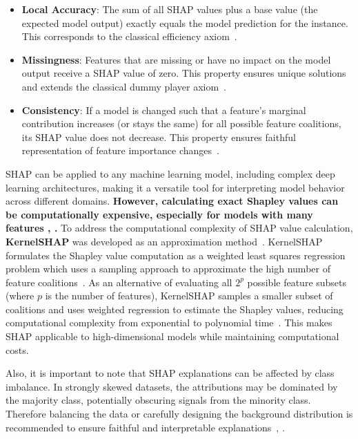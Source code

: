 \begin{itemize}
    \item \textbf{Local Accuracy}: The sum of all SHAP values plus a base value (the expected model output) exactly equals the model prediction for the instance. This corresponds to the classical efficiency axiom~\cite{lundberg2017shap}.
    \item \textbf{Missingness}: Features that are missing or have no impact on the model output receive a SHAP value of zero. This property ensures unique solutions and extends the classical dummy player axiom~\cite{lundberg2017shap}.
    \item \textbf{Consistency}: If a model is changed such that a feature's marginal contribution increases (or stays the same) for all possible feature coalitions, its SHAP value does not decrease. This property ensures faithful representation of feature importance changes~\cite{lundberg2017shap}.
\end{itemize}

SHAP can be applied to any machine learning model, including complex deep learning architectures, making it a versatile tool for interpreting model behavior across different domains. \textbf{However, calculating exact Shapley values can be computationally expensive, especially for models with many features \cite{rozemberczki2022shapley}, \cite{aas2021explaining}.}  To address the computational complexity of SHAP value calculation, \textbf{KernelSHAP} was developed as an approximation method~\cite{lundberg2017shap}. KernelSHAP formulates the Shapley value computation as a weighted least squares regression problem which uses a sampling approach to approximate the high number of feature coalitions~\cite{covert2021}. As an alternative of evaluating all $2^p$ possible feature subsets (where $p$ is the number of features), KernelSHAP samples a smaller subset of coalitions and uses weighted regression to estimate the Shapley values, reducing computational complexity from exponential to polynomial time~\cite{rozemberczki2022shapley}. This makes SHAP applicable to high-dimensional models while maintaining computational costs.

Also, it is important to note that SHAP explanations can be affected by class imbalance. In strongly skewed datasets, the attributions may be dominated by the majority class, potentially obscuring signals from the minority class. Therefore balancing the data or carefully designing the background distribution is recommended to ensure faithful and interpretable explanations~\cite{liu2022balancedbackgroundexplanationdata}, \cite{chen2024interpretable}.


